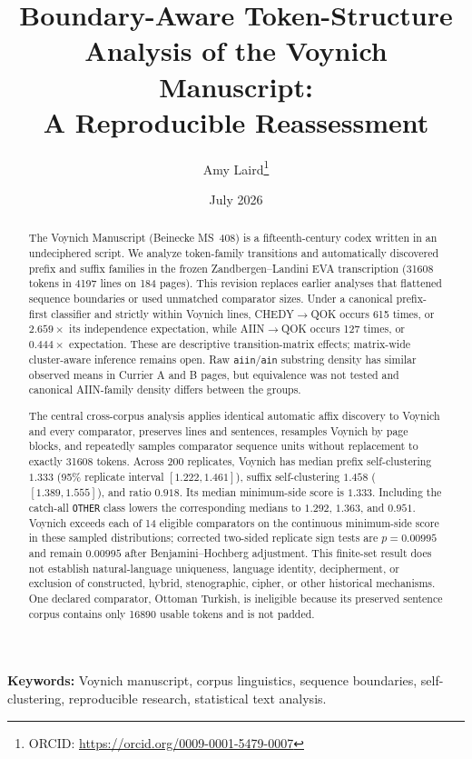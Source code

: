 \documentclass[11pt]{article}
\title{\textbf{Boundary-Aware Token-Structure Analysis of the Voynich Manuscript:\\
A Reproducible Reassessment}}
\author[1]{Amy Laird\thanks{ORCID: \url{https://orcid.org/0009-0001-5479-0007}}}
\affil[1]{Independent Researcher \\ \texttt{laird2214@gmail.com}}
\date{July 2026}
\newcommand{\num}[1]{#1}
\begin{document}
\maketitle

\begin{abstract}
The Voynich Manuscript (Beinecke MS~408) is a fifteenth-century codex
written in an undeciphered script. We analyze token-family transitions and
automatically discovered prefix and suffix families in the frozen
Zandbergen--Landini EVA transcription (\num{31608} tokens in \num{4197}
lines on 184 pages). This revision replaces earlier analyses that flattened
sequence boundaries or used unmatched comparator sizes. Under a canonical
prefix-first classifier and strictly within Voynich lines,
CHEDY$\to$QOK occurs 615 times, or $2.659\times$ its independence
expectation, while AIIN$\to$QOK occurs 127 times, or $0.444\times$
expectation. These are descriptive transition-matrix effects; matrix-wide
cluster-aware inference remains open. Raw \texttt{aiin}/\texttt{ain}
substring density has similar observed means in Currier A and B pages, but
equivalence was not tested and canonical AIIN-family density differs between
the groups.

The central cross-corpus analysis applies identical automatic affix discovery
to Voynich and every comparator, preserves lines and sentences, resamples
Voynich by page blocks, and repeatedly samples comparator sequence units
without replacement to exactly \num{31608} tokens. Across 200 replicates,
Voynich has median prefix self-clustering $1.333$ (95\% replicate interval
$[1.222,1.461]$), suffix self-clustering $1.458$ ($[1.389,1.555]$), and ratio
$0.918$. Its median minimum-side score is $1.333$. Including the catch-all
\texttt{OTHER} class lowers the corresponding medians to $1.292$, $1.363$,
and $0.951$. Voynich exceeds each of 14 eligible comparators on the continuous
minimum-side score in these sampled distributions; corrected two-sided
replicate sign tests are $p=0.00995$ and remain $0.00995$ after
Benjamini--Hochberg adjustment. This finite-set result does not establish
natural-language uniqueness, language identity, decipherment, or exclusion
of constructed, hybrid, stenographic, cipher, or other historical mechanisms.
One declared comparator, Ottoman Turkish, is ineligible because its preserved
sentence corpus contains only \num{16890} usable tokens and is not padded.
\end{abstract}

\noindent\textbf{Keywords:} Voynich manuscript, corpus linguistics,
sequence boundaries, self-clustering, reproducible research, statistical text
analysis.
\end{document}
